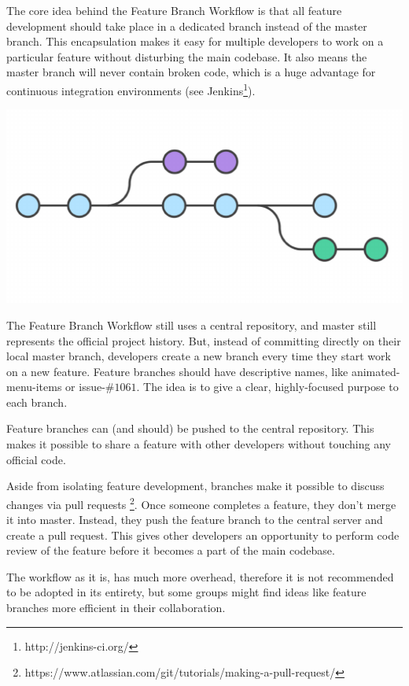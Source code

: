 \documentclass{article}
\begin{document}
The core idea behind the Feature Branch Workflow is that all feature
development should take place in a dedicated branch instead of the
master branch. This encapsulation makes it easy for multiple
developers to work on a particular feature without disturbing the main
codebase. It also means the master branch will never contain broken
code, which is a huge advantage for continuous integration
environments (see Jenkins\footnote{http://jenkins-ci.org/}).
 
\begin{center}
\includegraphics[scale=0.5]{figures/13.pdf}
\end{center}

The Feature Branch Workflow still uses a central repository, and
master still represents the official project history. But, instead of
committing directly on their local master branch, developers create a
new branch every time they start work on a new feature. Feature
branches should have descriptive names, like animated-menu-items or
issue-$\#1061$. The idea is to give a clear, highly-focused purpose to
each branch.

Feature branches can (and should) be pushed to the central
repository. This makes it possible to share a feature with other
developers without touching any official code.

Aside from isolating feature development, branches make it possible to
discuss changes via pull requests
\footnote{https://www.atlassian.com/git/tutorials/making-a-pull-request/}. 
Once someone completes a feature,
they don't merge it into master. Instead, they push the
feature branch to the central server and create a pull request. This
gives other developers an opportunity to perform code review of the
feature before it becomes a part of the main codebase.

The workflow as it is, has much more overhead, therefore it is not
recommended to be adopted in its entirety, but some groups might find
ideas like feature branches more efficient in their collaboration. 
\end{document}
